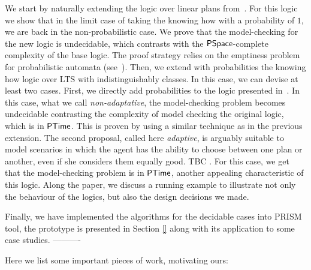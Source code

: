 We start by naturally extending the logic over linear plans from~\cite{Wang15lori,Wang16,Wang2016}.  For this logic we show that in the limit case of taking the knowing how with a probability of $1$, we are back in the non-probabilistic case. We prove that the model-checking for the new logic is undecidable,  which contrasts  with the ${\rm\textsf{PSpace}}$-complete complexity of the base logic. The proof strategy relies on the emptiness problem for probabilistic automata (see~\cite{MadaniHC99}). Then, we extend with probabilities the knowing how logic over LTS with indistinguishably classes. In this case, we can devise at least two cases.  First, we directly add probabilities to the logic presented in~\cite{AFSVQ21,AFSVQ23}. In this case, what we call \emph{non-adaptative}, the model-checking problem becomes undecidable  contrasting the complexity of model checking the original logic, which is in  ${\rm\textsf{PTime}}$. This is proven by using a similar technique as in the previous extension. The second proposal, called here \emph{adaptive}, is arguably suitable to model scenarios in which the agent has the ability to choose between one plan or another, even if she considers them equally good. TBC . For this case, we get that the model-checking problem is in ${\rm\textsf{PTime}}$, another appealing characteristic of this logic. Along the paper, we discuss a running example to illustrate not only the behaviour of the logics, but also the design decisions we made. 

Finally, we  have implemented the algorithms for the decidable cases into PRISM tool,  the prototype is presented in Section \ref{} along with its application to some case studies. 
\iffalse
---------- 

Here we list some important pieces of work, motivating ours:


